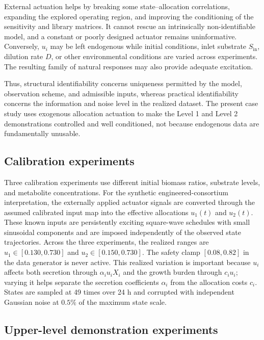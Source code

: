 \documentclass[11pt,a4paper]{article}
\begin{document}
External actuation helps by breaking some state--allocation correlations,
expanding the explored operating region, and improving the conditioning of
the sensitivity and library matrices. It cannot rescue an intrinsically
non-identifiable model, and a constant or poorly designed actuator remains
uninformative. Conversely, \(u_i\) may be left endogenous while initial
conditions, inlet substrate \(S_{\mathrm{in}}\), dilution rate \(D\), or other
environmental conditions are varied across experiments. The resulting family
of natural responses may also provide adequate excitation.

Thus, structural identifiability concerns uniqueness permitted by the model,
observation scheme, and admissible inputs, whereas practical identifiability
concerns the information and noise level in the realized dataset. The present
case study uses exogenous allocation actuation to make the Level 1 and Level 2
demonstrations controlled and well conditioned, not because endogenous data
are fundamentally unusable.

\subsection{Calibration experiments}

Three calibration experiments use different initial biomass ratios, substrate
levels, and metabolite concentrations. For the synthetic engineered-consortium
interpretation, the externally applied actuator signals are converted through
the assumed calibrated input map into the effective allocations \(u_1(t)\)
and \(u_2(t)\). These known inputs are persistently exciting square-wave
schedules with small sinusoidal components and are imposed independently of
the observed state trajectories. Across the three experiments, the realized
ranges are \(u_1\in[0.130,0.730]\) and \(u_2\in[0.150,0.730]\). The safety
clamp \([0.08,0.82]\) in the data generator is never active. This realized
variation is important because \(u_i\) affects both secretion through
\(\alpha_i u_iX_i\) and the growth burden through \(c_i u_i\); varying it
helps separate the secretion coefficients \(\alpha_i\) from the allocation
costs \(c_i\). States are sampled at 49 times over 24 h and corrupted
with independent Gaussian noise at \(0.5\%\) of the maximum state scale.

\subsection{Upper-level demonstration experiments}
\end{document}
